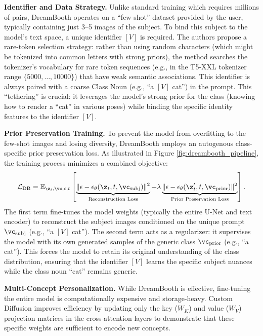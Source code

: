 \documentclass[../../book-main.tex]{subfiles}
\begin{document}
\textbf{Identifier and Data Strategy.}
Unlike standard training which requires millions of pairs, DreamBooth
operates on a ``few-shot'' dataset provided by the user, typically
containing just 3--5 images of the subject. To bind this subject to
the model's text space, a unique identifier $[V]$ is required. The
authors propose a rare-token selection strategy: rather than using
random characters (which might be tokenized into common letters with
strong priors), the method searches the tokenizer's vocabulary for
rare token sequences (e.g., in the T5-XXL tokenizer range $\{5000,
\dots, 10000\}$) that have weak semantic associations. This
identifier is always paired with a coarse Class Noun (e.g., ``a $[V]$
cat'') in the prompt. This ``tethering'' is crucial: it leverages the
model's strong prior for the class (knowing how to render a ``cat''
in various poses) while binding the specific identity features to the
identifier $[V]$.

\textbf{Prior Preservation Training.}
To prevent the model from overfitting to the few-shot images and
losing diversity, DreamBooth employs an autogenous class-specific
prior preservation loss. As illustrated in Figure
\ref{fig:dreambooth_pipeline}, the training process minimizes a
combined objective:
\begin{equation}
\mathcal{L}_{\text{DB}} = \mathbb{E}_{\z_t, \vc, \epsilon, t} \left[
    \underbrace{\| \epsilon - \epsilon_\theta(\z_t, t, \vc_{\text{subj}})
    \|^2}_{\text{Reconstruction Loss}} + \lambda \underbrace{\| \epsilon
    - \epsilon_\theta(\z'_t, t, \vc_{\text{prior}}) \|^2}_{\text{Prior
Preservation Loss}} \right].
\label{eq:dreambooth}
\end{equation}
The first term fine-tunes the model weights (typically the entire
U-Net and text encoder) to reconstruct the subject images conditioned
on the unique prompt $\vc_{\text{subj}}$ (e.g., ``a $[V]$ cat''). The
second term acts as a regularizer: it supervises the model with its
own generated samples of the generic class $\vc_{\text{prior}}$
(e.g., ``a cat''). This forces the model to retain its original
understanding of the class distribution, ensuring that the identifier
$[V]$ learns the specific subject nuances while the class noun
``cat'' remains generic.

\textbf{Multi-Concept Personalization.}
While DreamBooth is effective, fine-tuning the entire model is
computationally expensive and storage-heavy. Custom Diffusion
\cite{kumari2023multi} improves efficiency by updating only the key
($W_K$) and value ($W_V$) projection matrices in the cross-attention
layers to demonstrate that these specific weights are sufficient to
encode new concepts.
\end{document}
